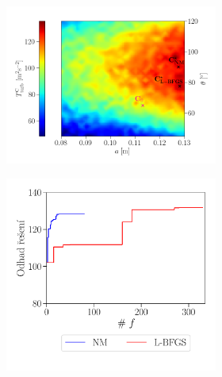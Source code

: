 \begin{figure}[h]
	\vspace{-10mm}
	\ContinuedFloat 
	\begin{subfigure}[b]{1.0\textwidth}		
	\begin{subfigure}[b]{0.61\textwidth}		
		\hspace{-19mm}
		\centering
		\includegraphics[width=1.06\textwidth, trim={0mm 4mm 0 15mm}]{Images/3full.png}
		\vspace{3mm}
	\end{subfigure}
	\begin{subfigure}[b]{0.001\textwidth}
		\centering
		\hspace{1mm}
	\end{subfigure}	
	\begin{subfigure}[b]{0.38\textwidth}
		\vspace{-10mm}
		\centering
		\vspace{-2mm}
		\includegraphics[width=1.1\textwidth, trim={12mm 0 0 0mm}]{Images/3.pdf}

\end{subfigure}
\end{subfigure}
\end{figure}
